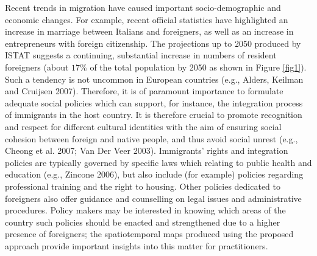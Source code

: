 \documentclass[10pt] {article}
\theoremstyle{definition}
\theoremstyle{plain}
\begin{document}
Recent trends in migration have caused important socio-demographic and economic changes. For example, recent official statistics have highlighted an increase in marriage between Italians and foreigners, as well as an increase in entrepreneurs with foreign citizenship. The projections up to 2050 produced by ISTAT suggests a continuing, substantial increase in numbers of resident foreigners (about $17\%$ of the total population by 2050 as shown in Figure \ref{fig1}). Such a tendency is not uncommon in European countries (e.g., Alders, Keilman and Cruijsen 2007). Therefore, it is of paramount importance to formulate adequate social policies which can support, for instance, the integration process of immigrants in the host country. It is therefore crucial to promote recognition and respect for different cultural identities with the aim of ensuring social cohesion between foreign and native people, and thus avoid social unrest (e.g., Cheong et al. 2007; Van Der Veer 2003). Immigrants' rights and integration policies are typically governed by specific laws which relating to public health and education (e.g., Zincone 2006), but also include (for example) policies regarding professional training and the right to housing. Other policies dedicated to foreigners also offer guidance and counselling on legal issues and administrative procedures. Policy makers may be interested in knowing which areas of the country such policies should be enacted and strengthened due to a higher presence of foreigners; the spatiotemporal maps produced using the proposed approach provide important insights into this matter for practitioners.
\end{document}
